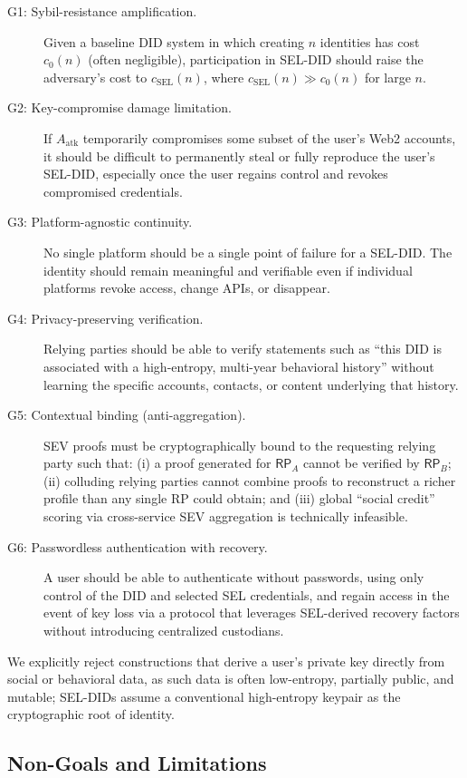 \documentclass[11pt]{article}
\begin{document}
\begin{description}
  \item[G1: Sybil-resistance amplification.] Given a baseline DID system in which creating $n$ identities has cost $c_0(n)$ (often negligible), participation in SEL-DID should raise the adversary's cost to $c_{\text{SEL}}(n)$, where $c_{\text{SEL}}(n) \gg c_0(n)$ for large $n$.
  \item[G2: Key-compromise damage limitation.] If $A_{\text{atk}}$ temporarily compromises some subset of the user's Web2 accounts, it should be difficult to permanently steal or fully reproduce the user's SEL-DID, especially once the user regains control and revokes compromised credentials.
  \item[G3: Platform-agnostic continuity.] No single platform should be a single point of failure for a SEL-DID. The identity should remain meaningful and verifiable even if individual platforms revoke access, change APIs, or disappear.
  \item[G4: Privacy-preserving verification.] Relying parties should be able to verify statements such as ``this DID is associated with a high-entropy, multi-year behavioral history'' without learning the specific accounts, contacts, or content underlying that history.
  \item[G5: Contextual binding (anti-aggregation).] SEV proofs must be cryptographically bound to the requesting relying party such that: (i) a proof generated for $\textsf{RP}_A$ cannot be verified by $\textsf{RP}_B$; (ii) colluding relying parties cannot combine proofs to reconstruct a richer profile than any single RP could obtain; and (iii) global ``social credit'' scoring via cross-service SEV aggregation is technically infeasible.
    \item[G6: Passwordless authentication with recovery.] A user should be able to authenticate without passwords, using only control of the DID and selected SEL credentials, and regain access in the event of key loss via a protocol that leverages SEL-derived recovery factors without introducing centralized custodians.
\end{description}

We explicitly reject constructions that derive a user's private key directly from social or behavioral data, as such data is often low-entropy, partially public, and mutable; SEL-DIDs assume a conventional high-entropy keypair as the cryptographic root of identity.

\subsection{Non-Goals and Limitations}
\end{document}
